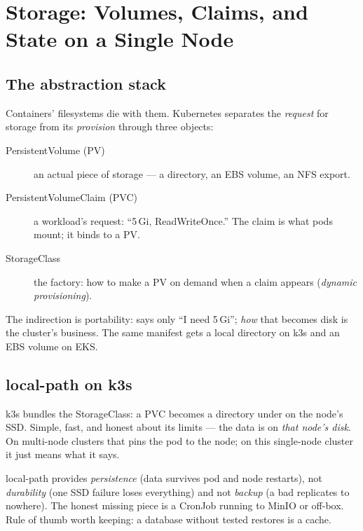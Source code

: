 \chapter{Storage: Volumes, Claims, and State on a Single Node}
\label{ch:storage}

\section{The abstraction stack}

Containers' filesystems die with them. Kubernetes separates the
\emph{request} for storage from its \emph{provision} through three
objects:

\begin{description}
  \item[PersistentVolume (PV)] an actual piece of storage --- a
  directory, an EBS volume, an NFS export.
  \item[PersistentVolumeClaim (PVC)] a workload's request: ``5\,Gi,
  ReadWriteOnce.'' The claim is what pods mount; it binds to a PV.
  \item[StorageClass] the factory: how to make a PV on demand when a
  claim appears (\emph{dynamic provisioning}).
\end{description}

The indirection is portability:  says only
``I need 5\,Gi''; \emph{how} that becomes disk is the cluster's
business. The same manifest gets a local directory on k3s and an EBS
volume on EKS.

\section{local-path on k3s}

k3s bundles the  StorageClass: a PVC becomes a
directory under  on the node's SSD.
Simple, fast, and honest about its limits --- the data is on \emph{that
node's disk}. On multi-node clusters that pins the pod to the node; on
this single-node cluster it just means what it says.

\begin{hardware}
local-path provides \emph{persistence} (data survives pod and node
restarts), not \emph{durability} (one SSD failure loses everything) and
not \emph{backup} (a bad  replicates to nowhere).
The honest missing piece is a CronJob running  to MinIO
or off-box. Rule of thumb worth keeping: a database without tested
restores is a cache.
\end{hardware}

